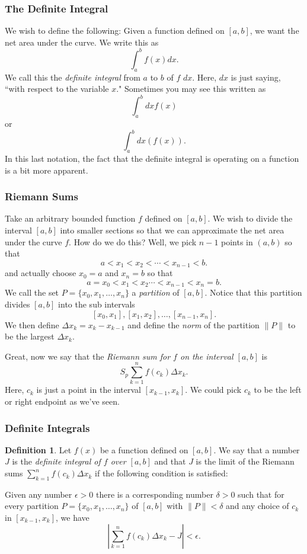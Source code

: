 \documentclass[leqno]{article}
\theoremstyle{definition}
\newtheorem{definition}{Definition}[section]
\theoremstyle{remark}
\theoremstyle{theorem}
\begin{document}
\subsubsection{The Definite Integral}

We wish to define the following: Given a function defined on $[a,b]$, we want the net area under the curve.  We write this as
\[
\int_a^b f(x)dx.
\]
We call this the \emph{definite integral} from $a$ to $b$ of $f$ $dx$.  Here, $dx$ is just saying, ``with respect to the variable $x$." Sometimes you may see this written as
\[
\int_a^b dx f(x)
\]
or
\[
\int_a^b dx (f(x)).
\]
In this last notation, the fact that the definite integral is operating on a function is a bit more apparent.

\subsubsection{Riemann Sums}

Take an arbitrary bounded function $f$ defined on $[a,b]$. We wish to divide the interval $[a,b]$ into smaller sections so that we can approximate the net area under the curve $f$.  How do we do this? Well, we pick $n-1$ points in $(a,b)$ so that
\[
a<x_1<x_2<\cdots < x_{n-1} < b.
\]
and actually choose $x_0=a$ and $x_n=b$ so that
\[
a=x_0<x_1<x_2\cdots<x_{n-1}<x_n=b.
\]
We call the set $P=\{x_0,x_1,\dots,x_n\}$ a \emph{partition} of $[a,b]$.  Notice that this partition divides $[a,b]$ into the sub intervals
\[
[x_0,x_1],[x_1,x_2],\dots,[x_{n-1},x_n].
\]
We then define $\Delta x_k = x_k-x_{k-1}$ and define the \emph{norm} of the partition $\|P\|$ to be the largest $\Delta x_k$. 

Great, now we say that the \emph{Riemann sum for $f$ on the interval $[a,b]$} is
\[
S_p \sum_{k=1}^n f(c_k)\Delta x_k.
\]
Here, $c_k$ is just a point in the interval $[x_{k-1},x_k]$. We could pick $c_k$ to be the left or right endpoint as we've seen.


\subsubsection{Definite Integrals}

\begin{definition}
Let $f(x)$ be a function defined on $[a,b]$. We say that a number $J$ is the \emph{definite integral of $f$ over $[a,b]$} and that $J$ is the limit of the Riemann sums $\sum_{k=1}^n f(c_k)\Delta x_k$ if the following condition is satisfied:

Given any number $\epsilon>0$ there is a corresponding number $\delta>0$ such that for every partition $P=\{x_0,x_1,\dots,x_n\}$ of $[a,b]$ with $\|P\|<\delta$ and any choice of $c_k$ in $[x_{k-1},x_k]$, we have
\[
\left| \sum_{k=1}^n f(c_k)\Delta x_k - J \right| < \epsilon.
\]
\end{definition}
\end{document}

